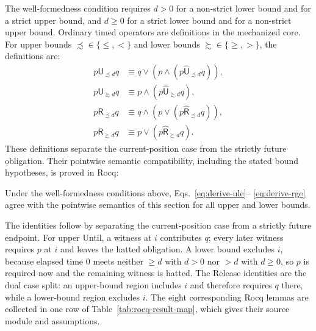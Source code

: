 \documentclass[manuscript]{acmart}
\newcommand{\Until}{\mathbin{\mathsf{U}}}
\newcommand{\Release}{\mathbin{\mathsf{R}}}
\newcommand{\hUntil}{\mathbin{\widehat{\mathsf{U}}}}
\newcommand{\hRelease}{\mathbin{\widehat{\mathsf{R}}}}
\begin{document}
The well-formedness condition requires $d>0$ for a non-strict lower bound and
for a strict upper bound, and $d\ge0$ for a strict lower bound and for a
non-strict upper bound. Ordinary timed
operators are definitions in the mechanized core. For upper bounds
$\precsim\in\{\le,<\}$ and lower bounds $\succsim\in\{\ge,>\}$, the definitions are:
\begin{align}
p\Until_{\precsim d}q &\equiv q\lor(p\land(p\hUntil_{\precsim d}q)),\label{eq:derive-ule}\\
p\Until_{\succsim d}q &\equiv p\land(p\hUntil_{\succsim d}q),\label{eq:derive-uge}\\
p\Release_{\precsim d}q &\equiv q\land(p\lor(p\hRelease_{\precsim d}q)),\label{eq:derive-rle}\\
p\Release_{\succsim d}q &\equiv p\lor(p\hRelease_{\succsim d}q).\label{eq:derive-rge}
\end{align}
These definitions separate the current-position case from the strictly future
obligation. Their pointwise semantic compatibility, including the stated
bound hypotheses, is proved in Rocq:
\begin{theorem}
\label{thm:derived-semantic-compatibility}
Under the well-formedness conditions above, Eqs.~\eqref{eq:derive-ule}--
\eqref{eq:derive-rge} agree with the pointwise semantics of this section for all upper and lower
bounds.
\end{theorem}
The identities follow by separating the current-position case from a
strictly future endpoint. For upper Until, a witness at $i$ contributes
$q$; every later witness requires $p$ at $i$ and leaves the hatted
obligation. A lower bound excludes $i$, because elapsed time $0$ meets neither
$\ge d$ with $d>0$ nor $>d$ with $d\ge0$, so $p$ is required now
and the remaining witness is hatted. The Release identities are the dual
case split: an upper-bound region includes $i$ and therefore requires $q$
there, while a lower-bound region excludes $i$. The eight corresponding
Rocq lemmas are collected in one row of Table~\ref{tab:rocq-result-map},
which gives their source module and assumptions.
\end{document}
